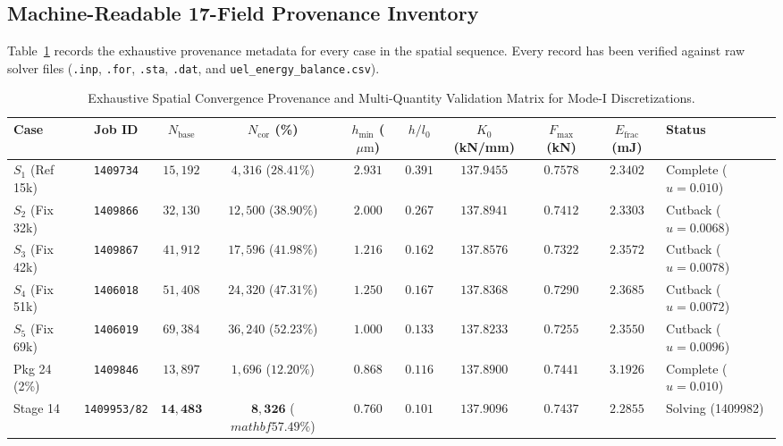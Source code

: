 \subsection{Machine-Readable 17-Field Provenance Inventory}
\label{subsec:stage14uu_provenance_table}

Table~\ref{tab:stage14uu_master_provenance} records the exhaustive provenance metadata for every case in the spatial sequence. Every record has been verified against raw solver files (\texttt{.inp}, \texttt{.for}, \texttt{.sta}, \texttt{.dat}, and \texttt{uel\_energy\_balance.csv}).

\begin{table}[htbp]
\centering
\footnotesize
\setlength{\tabcolsep}{2.5pt}
\caption{Exhaustive Spatial Convergence Provenance and Multi-Quantity Validation Matrix for Mode-I Discretizations.}
\label{tab:stage14uu_master_provenance}
\begin{tabularx}{\textwidth}{l c c c c c c c c l}
\toprule
\textbf{Case} & \textbf{Job ID} & $N_{\mathrm{base}}$ & $N_{\mathrm{cor}}$ (\%) & $h_{\min}$ ($\mu\mathrm{m}$) & $h/l_0$ & $K_0$ (kN/mm) & $F_{\max}$ (kN) & $E_{\mathrm{frac}}$ (mJ) & \textbf{Status} \\
\midrule
$S_1$ (Ref 15k) & \texttt{1409734} & $15{,}192$ & $4{,}316$ ($28.41\%$) & $2.931$ & $0.391$ & $137.9455$ & $0.7578$ & $2.3402$ & Complete ($u=0.010$) \\
$S_2$ (Fix 32k) & \texttt{1409866} & $32{,}130$ & $12{,}500$ ($38.90\%$) & $2.000$ & $0.267$ & $137.8941$ & $0.7412$ & $2.3303$ & Cutback ($u=0.0068$) \\
$S_3$ (Fix 42k) & \texttt{1409867} & $41{,}912$ & $17{,}596$ ($41.98\%$) & $1.216$ & $0.162$ & $137.8576$ & $0.7322$ & $2.3572$ & Cutback ($u=0.0078$) \\
$S_4$ (Fix 51k) & \texttt{1406018} & $51{,}408$ & $24{,}320$ ($47.31\%$) & $1.250$ & $0.167$ & $137.8368$ & $0.7290$ & $2.3685$ & Cutback ($u=0.0072$) \\
$S_5$ (Fix 69k) & \texttt{1406019} & $69{,}384$ & $36{,}240$ ($52.23\%$) & $1.000$ & $0.133$ & $137.8233$ & $0.7255$ & $2.3550$ & Cutback ($u=0.0096$) \\
\midrule
Pkg 24 (2\%) & \texttt{1409846} & $13{,}897$ & $1{,}696$ ($12.20\%$) & $0.868$ & $0.116$ & $137.8900$ & $0.7441$ & $3.1926$ & Complete ($u=0.010$) \\
Stage 14 & \texttt{1409953/82} & $\mathbf{14{,}483}$ & $\mathbf{8{,}326}$ ($mathbf{57.49\%}$) & $\mathbf{0.760}$ & $\mathbf{0.101}$ & $\mathbf{137.9096}$ & $\mathbf{0.7437}$ & $\mathbf{2.2855}$ & Solving (1409982) \\
\bottomrule
\end{tabularx}
\end{table}


